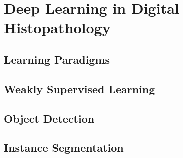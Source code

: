 \chapter{Deep Learning in Digital Histopathology}

\section{Learning Paradigms}

\section{Weakly Supervised Learning}

\section{Object Detection}

\section{Instance Segmentation}